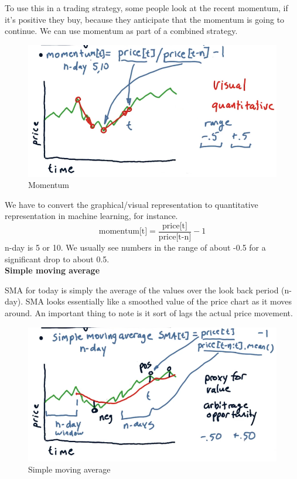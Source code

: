 \documentclass[12pt]{article}
\begin{document}
To use this in a trading strategy, some people look at the recent momentum, if it's positive they buy, because they anticipate that the momentum is going to continue. We can use momentum as part of a combined strategy. 

\begin{figure}[!ht]
\centering
\includegraphics[scale=0.4]{fig/fig46}
\caption{Momentum}
\end{figure}

We have to convert the graphical/visual representation to quantitative representation in machine learning, for instance. 
\begin{equation}
\text{momentum[t]} = \frac{\text{price[t]}}{\text{price[t-n]}} - 1
\end{equation}
n-day is 5 or 10.  We usually see numbers in the range of about -0.5 for a significant drop to about 0.5. \\[18pt]
\noindent
\textbf{Simple moving average} 

SMA for today is simply the average of the values over the look back period (n-day). SMA looks essentially like a smoothed value of the price chart as it moves around. An important thing to note is it sort of lags the actual price movement.

\begin{figure}[!ht]
\centering
\includegraphics[scale=0.4]{fig/fig47}
\caption{Simple moving average}
\end{figure}
\end{document}
